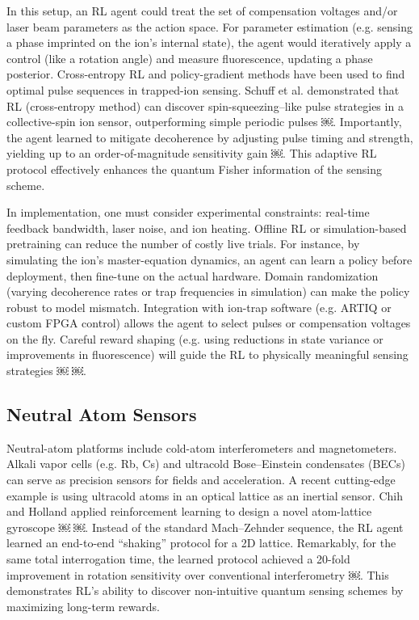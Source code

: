\documentclass[
    aps,
    prx,
    reprint,
    superscriptaddress,
    amsmath,
    amssymb,
    longbibliography
]{revtex4-2}
\begin{document}
In this setup, an RL agent could treat the set of compensation
voltages and/or laser beam parameters as the action space. For
parameter estimation (e.g. sensing a phase imprinted on the ion’s
internal state), the agent would iteratively apply a control (like a
rotation angle) and measure fluorescence, updating a phase
posterior. Cross-entropy RL and policy-gradient methods have been used
to find optimal pulse sequences in trapped-ion sensing. Schuff et
al. demonstrated that RL (cross-entropy method) can discover
spin-squeezing–like pulse strategies in a collective-spin ion sensor,
outperforming simple periodic pulses ￼. Importantly, the agent learned
to mitigate decoherence by adjusting pulse timing and strength,
yielding up to an order-of-magnitude sensitivity gain ￼. This adaptive
RL protocol effectively enhances the quantum Fisher information of the
sensing scheme.

In implementation, one must consider experimental constraints:
real-time feedback bandwidth, laser noise, and ion heating. Offline RL
or simulation-based pretraining can reduce the number of costly live
trials. For instance, by simulating the ion’s master-equation
dynamics, an agent can learn a policy before deployment, then
fine-tune on the actual hardware. Domain randomization (varying
decoherence rates or trap frequencies in simulation) can make the
policy robust to model mismatch. Integration with ion-trap software
(e.g. ARTIQ or custom FPGA control) allows the agent to select pulses
or compensation voltages on the fly. Careful reward shaping
(e.g. using reductions in state variance or improvements in
fluorescence) will guide the RL to physically meaningful sensing
strategies ￼ ￼.


\subsection{Neutral Atom Sensors}

Neutral-atom platforms include cold-atom interferometers and
magnetometers. Alkali vapor cells (e.g. Rb, Cs) and ultracold
Bose–Einstein condensates (BECs) can serve as precision sensors for
fields and acceleration. A recent cutting-edge example is using
ultracold atoms in an optical lattice as an inertial sensor. Chih and
Holland applied reinforcement learning to design a novel atom-lattice
gyroscope ￼ ￼. Instead of the standard Mach–Zehnder sequence, the RL
agent learned an end-to-end “shaking” protocol for a 2D
lattice. Remarkably, for the same total interrogation time, the
learned protocol achieved a 20-fold improvement in rotation
sensitivity over conventional interferometry ￼. This demonstrates RL’s
ability to discover non-intuitive quantum sensing schemes by
maximizing long-term rewards.
\end{document}
